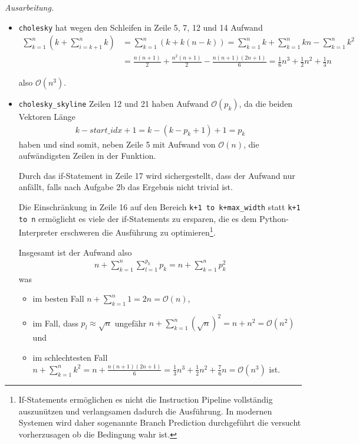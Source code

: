 \documentclass[titlepage]{article}
\newenvironment{ausarbeitung}{\vspace{3mm}\noindent\textit{Ausarbeitung.}}{}
\begin{document}
\begin{ausarbeitung}
\begin{itemize}
		\item \texttt{cholesky} hat wegen den Schleifen in Zeile 5, 7, 12 und 14 Aufwand
		\begin{align*}
			\sum_{k=1}^{n}(k + \sum_{i=k+1}^{n}k) &= \sum_{k=1}^{n}(k+k(n-k)) = \sum_{k=1}^{n}k + \sum_{k=1}^{n}kn - \sum_{k=1}^{n}k^2 \\
			&= \frac{n(n+1)}{2} + \frac{n^2(n+1)}{2} - \frac{n(n+1)(2n+1)}{6} = \frac{1}{6}n^3 + \frac{1}{2}n^2 + \frac{1}{3}n
		\end{align*}
		
		also $\mathcal{O}(n^3)$.
		
		\item \texttt{cholesky\_skyline} Zeilen 12 und 21 haben Aufwand $\mathcal{O}(p_k)$, da die beiden Vektoren Länge
		\begin{align*}
			k - start\_idx + 1 = k - (k - p_k + 1) + 1 = p_k
		\end{align*}
		haben und sind somit, neben Zeile 5 mit Aufwand von $\mathcal{O}(n)$, die aufwändigsten Zeilen in der Funktion.
		
		Durch das if-Statement in Zeile 17 wird sichergestellt, dass der Aufwand nur anfällt, falls nach Aufgabe 2b das Ergebnis nicht trivial ist.
		
		Die Einschränkung in Zeile 16 auf den Bereich \texttt{k+1 to k+max\_width} statt \texttt{k+1 to n} ermöglicht es viele der if-Statements zu ersparen, die es dem Python-Interpreter erschweren die Ausführung zu optimieren\footnote{If-Statements ermöglichen es nicht die Instruction Pipeline vollständig auszunützen und verlangsamen dadurch die Ausführung. In modernen Systemen wird daher sogenannte Branch Prediction durchgeführt die versucht vorherzusagen ob die Bedingung wahr ist.}.
		
		Insgesamt ist der Aufwand also
		\begin{align*}
			n + \sum_{k=1}^{n} \sum_{l=1}^{p_k}p_k = n + \sum_{k=1}^{n} p_k^2
		\end{align*}
		was
		\begin{itemize}
			\item im besten Fall $n + \sum_{k=1}^{n} 1 = 2n = \mathcal{O}(n)$,
			\item im Fall, dass $p_l \approx \sqrt{n}$ ungefähr $n + \sum_{k=1}^{n}(\sqrt{n})^2 = n + n^2 = \mathcal{O}(n^2)$ und
			\item im schlechtesten Fall $n + \sum_{k=1}^{n}k^2 = n + \frac{n(n+1)(2n+1)}{6} = \frac{1}{3}n^3 + \frac{1}{2}n^2 + \frac{7}{6}n = \mathcal{O}(n^3)$ ist.
		\end{itemize}
	\end{itemize}
	
\end{ausarbeitung}
\end{document}
